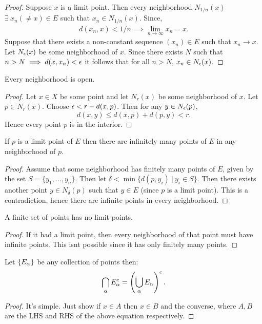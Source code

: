 \begin{proof}
  Suppose $x$ is a limit point. Then every neighborhood $N_{1/n}(x)$ $\exists\ x_n (\neq x) \in E$ such that $x_n \in N_{1/n}(x)$. Since,
  \begin{align*}
    d(x_n, x) < 1/n \implies \lim_{n\to \infty} x_n = x.
  \end{align*}
  Suppose that there exists a non-constant sequence $(x_n) \in E$ such that $x_n \to x$. Let $N_\epsilon(x)$ be some neighborhood of $x$. Since there exists $N$ such that $n>N \implies d(x,x_n)<\epsilon$ it follows that for all $n>N$, $x_n \in N_\epsilon(x)$.
\end{proof}
\begin{proposition}
  Every neighborhood is open.
\end{proposition}
\begin{proof}
  Let $x\in X$ be some point and let $N_r(x)$ be some neighborhood of $x$. Let $p\in N_r(x)$. Choose $\epsilon < r- d(x,p)$. Then for any $y\in N_\epsilon(p)$, 
  \[d(x,y) \leq d(x,p) + d(p,y) < r.\]
  Hence every point $p$ is in the interior.
\end{proof}
\begin{proposition}
  If $p$ is a limit point of $E$ then there are infinitely many points of $E$ in any neighborhood of $p$.
\end{proposition}
\begin{proof}
  Assume that some neighborhood has finitely many points of $E$, given by the set $S= \{y_1,...,y_n\}$. Then let $\delta < \min\{d(p,y_i)\ |\ y_i \in S\}$. Then there exists another point $y\in N_\delta (p)$ such that $y\in E$ (since $p$ is a limit point). This is a contradiction, hence there are infinite points in every neighborhood.
\end{proof}
\begin{corollary}
  A finite set of points has no limit points.
\end{corollary}
\begin{proof}
  If it had a limit point, then every neighborhood of that point must have infinite points. This isnt possible since it has only finitely many points.
\end{proof}
\begin{proposition}
  Let $\{E_\alpha\}$ be any collection of points then:
  \[\bigcap_\alpha E_\alpha^c = \left(\bigcup_\alpha E_\alpha\right)^c.\]
\end{proposition}
\begin{proof}
  It's simple. Just show if $x\in A$ then $x\in B$ and the converse, where $A,B$ are the LHS and RHS of the above equation respectively. 
\end{proof}
